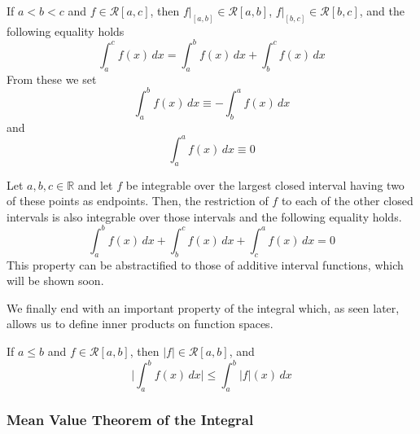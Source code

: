     \begin{lemma}
      If $a < b < c$ and $f \in \mathcal{R}[a, c]$, then $f \big|_{[a,b]} \in \mathcal{R}[a, b]$, $f \big|_{[b,c]} \in \mathcal{R}[b, c]$, and the following equality holds 
      \[\int_a^c f(x)\,dx = \int_a^b f(x)\, dx + \int_b^c f(x)\,dx\]
      From these we set
      \[\int_a^b f(x)\,dx \equiv - \int_b^a f(x)\,dx\]
      and 
      \[\int_a^a f(x)\,dx \equiv 0\]
    \end{lemma}

    \begin{theorem}
    Let $a, b, c \in \mathbb{R}$ and let $f$ be integrable over the largest closed interval having two of these points as endpoints. Then, the restriction of $f$ to each of the other closed intervals is also integrable over those intervals and the following equality holds. 
    \[\int_a^b f(x)\,dx + \int_b^c f(x)\,dx + \int_c^a f(x)\,dx = 0\]
    This property can be abstractified to those of additive interval functions, which will be shown soon. 
    \end{theorem}

    We finally end with an important property of the integral which, as seen later, allows us to define inner products on function spaces. 
    \begin{theorem}
    If $a \leq b$ and $f \in \mathcal{R}[a, b]$, then $|f| \in \mathcal{R}[a, b]$, and 
    \[\Bigg| \int_a^b f(x)\,dx \Bigg| \leq \int_a^b |f|(x)\,dx\]
    \end{theorem}

    \subsubsection{Mean Value Theorem of the Integral}

